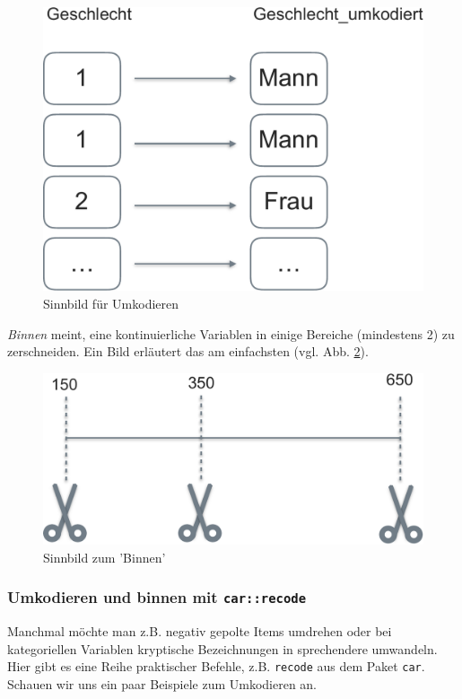 \documentclass[12pt,ngerman,]{book}
\begin{document}
\begin{figure}

{\centering \includegraphics[width=0.7\linewidth]{images/umkodieren_crop} 

}

\caption{Sinnbild für Umkodieren}\label{fig:umkodieren}
\end{figure}

\emph{Binnen} meint, eine kontinuierliche Variablen in
einige Bereiche (mindestens 2) zu zerschneiden. Ein Bild erläutert das
am einfachsten (vgl. Abb. \ref{fig:cut-schere}).

\begin{figure}

{\centering \includegraphics[width=0.7\linewidth]{images/cut_schere_crop} 

}

\caption{Sinnbild zum 'Binnen'}\label{fig:cut-schere}
\end{figure}

\subsubsection{\texorpdfstring{Umkodieren und binnen mit
\texttt{car::recode}}{Umkodieren und binnen mit car::recode}}\label{umkodieren-und-binnen-mit-carrecode}

Manchmal möchte man z.B. negativ gepolte Items umdrehen oder bei
kategoriellen Variablen kryptische Bezeichnungen in sprechendere
umwandeln. Hier gibt es eine Reihe praktischer Befehle, z.B.
\texttt{recode} aus dem Paket \texttt{car}. Schauen wir uns ein paar
Beispiele zum Umkodieren an.
\end{document}
